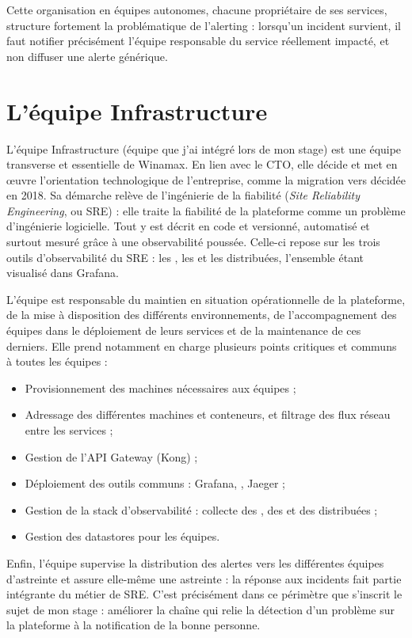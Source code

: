 Cette organisation en équipes autonomes, chacune propriétaire de ses services, structure fortement
la problématique de l'alerting : lorsqu'un incident survient, il faut notifier précisément l'équipe
responsable du service réellement impacté, et non diffuser une alerte générique.

\section{L'équipe Infrastructure}

L'équipe Infrastructure (équipe que j'ai intégré lors de mon stage) est une équipe transverse et essentielle de Winamax. En lien avec le CTO, elle
décide et met en œuvre l'orientation technologique de l'entreprise, comme la migration vers 
décidée en 2018. Sa démarche relève de l'ingénierie de la fiabilité (\emph{Site Reliability Engineering},
ou SRE) : elle traite la fiabilité de la plateforme comme un problème d'ingénierie logicielle. Tout y est
décrit en code et versionné, automatisé et surtout mesuré grâce à une observabilité poussée. Celle-ci repose sur les trois outils d'observabilité du SRE : les
, les  et les  distribuées, l'ensemble étant visualisé dans Grafana.

L'équipe est responsable du maintien en situation opérationnelle de la plateforme, de la mise à disposition des différents environnements, de
l'accompagnement des équipes dans le déploiement de leurs services et de la maintenance de ces
derniers. Elle prend notamment en charge plusieurs points critiques et communs à toutes les
équipes :

\begin{itemize}
	\item Provisionnement des machines nécessaires aux équipes ;
	\item Adressage des différentes machines et conteneurs, et filtrage des flux réseau entre les services ;
	\item Gestion de l'API Gateway (Kong) ;
	\item Déploiement des outils communs : Grafana, , Jaeger ;
	\item Gestion de la stack d'observabilité : collecte des , des  et des  distribuées ;
	\item Gestion des datastores pour les équipes.
\end{itemize}

Enfin, l'équipe supervise la distribution des alertes vers les différentes équipes d'astreinte et assure
elle-même une astreinte : la réponse aux incidents fait partie intégrante du métier de SRE. C'est
précisément dans ce périmètre que s'inscrit le sujet de mon stage : améliorer la chaîne qui relie la
détection d'un problème sur la plateforme à la notification de la bonne personne.


